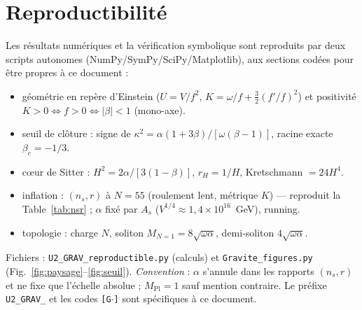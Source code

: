 \documentclass[11pt,a4paper]{article}
\newcommand{\Mpl}{M_{\mathrm{Pl}}}
\theoremstyle{plain}
\theoremstyle{remark}
\begin{document}
\section*{Reproductibilit\'e}
Les r\'esultats num\'eriques et la v\'erification symbolique sont reproduits par deux scripts
autonomes (NumPy/SymPy/SciPy/Matplotlib), aux sections cod\'ees pour \^etre propres \`a ce
document :
\begin{itemize}
\item[{\texttt{[G1]}}] g\'eom\'etrie en repère d'Einstein ($U=V/f^2$, $K=\omega/f+\tfrac32(f'/f)^2$) et positivit\'e $K>0\Leftrightarrow f>0\Leftrightarrow|\beta|<1$ (mono-axe).
\item[{\texttt{[G2]}}] seuil de cl\^oture : signe de $\kappa^2=\alpha(1+3\beta)/[\omega(\beta-1)]$, racine exacte $\beta_c=-1/3$.
\item[{\texttt{[G3]}}] c\oe ur de Sitter : $H^2=2\alpha/[3(1-\beta)]$, $r_H=1/H$, Kretschmann $=24H^4$.
\item[{\texttt{[G4]}}] inflation : $(n_s,r)$ \`a $N=55$ (roulement lent, m\'etrique $K$) --- reproduit la Table~\ref{tab:nsr} ; $\alpha$ fix\'e par $A_s$ ($V^{1/4}\approx1{,}4\times10^{16}$~GeV), running.
\item[{\texttt{[G5]}}] topologie : charge $N$, soliton $M_{N=1}=8\sqrt{\omega\alpha}$, demi-soliton $4\sqrt{\omega\alpha}$.
\end{itemize}
Fichiers : \texttt{U2\_GRAV\_reproductible.py} (calculs) et \texttt{Gravite\_figures.py}
(Fig.~\ref{fig:paysage}--\ref{fig:seuil}). \emph{Convention} : $\alpha$ s'annule dans les
rapports $(n_s,r)$ et ne fixe que l'\'echelle absolue ; $\Mpl=1$ sauf mention contraire. Le
pr\'efixe \texttt{U2\_GRAV\_} et les codes \texttt{[G$\cdot$]} sont sp\'ecifiques \`a ce document.
\end{document}
